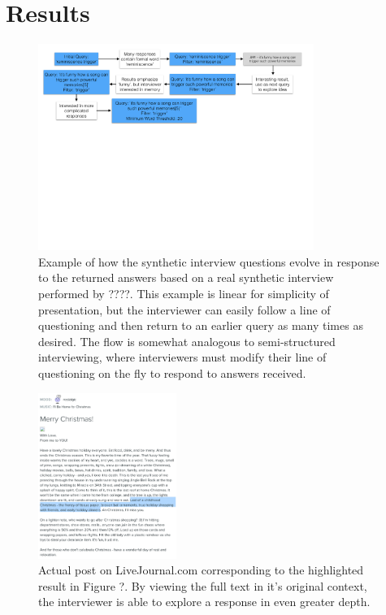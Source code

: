 \documentclass{sigchi}
\begin{document}
\section{Results}

\begin{figure}[htb]
\centering \includegraphics[width=0.8\textwidth]{figures/InterviewFlow.pdf} 
\caption{Example of how the synthetic interview questions evolve in response to the returned answers based on a real synthetic interview performed by ????. This example is linear for simplicity of presentation, but the interviewer can easily follow a line of questioning and then return to an earlier query as many times as desired. The flow is somewhat analogous to semi-structured interviewing, where interviewers must modify their line of questioning on the fly to respond to answers received.}
\end{figure}

\begin{figure}[tb]
\centering \includegraphics[width=0.4\textwidth]{figures/examplePost2} 
\caption{Actual post on LiveJournal.com corresponding to the highlighted result in Figure ?. By viewing the full text in it's original context, the interviewer is able to explore a response in even greater depth. }
\end{figure}
\end{document}
